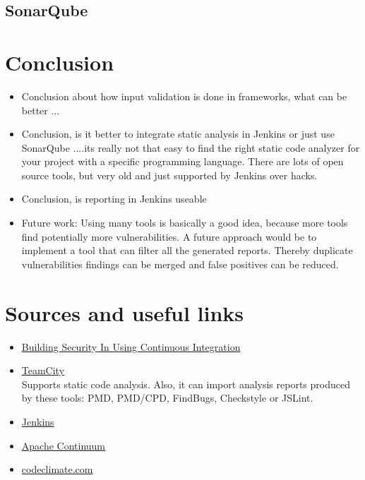 \documentclass[conference]{IEEEtran}
\begin{document}
\subsection{SonarQube}
\label{sec:evaluation_sonarqube}




\section{Conclusion}
\label{sec:conclusion}
\begin{itemize}
	\item Conclusion about how input validation is done in frameworks, what can be better ...
	\item Conclusion, is it better to integrate static analysis in Jenkins or just use SonarQube
	....its really not that easy to find the right static code analyzer for your project with a specific programming language. There are lots of open source tools, but very old and just supported by Jenkins over hacks.
	\item Conclusion, is reporting in Jenkins useable
	\item Future work: Using many tools is basically a good idea, because more tools find potentially more vulnerabilities. A future approach would be to implement a tool that can filter all the generated reports. Thereby duplicate vulnerabilities findings can be merged and false positives can be reduced.
\end{itemize}






\section{Sources and useful links}
\begin{itemize}
	\item \href{http://www.crosstalkonline.org/storage/issue-archives/2010/201003/201003-Stiehm.pdf}{Building Security In Using Continuous Integration}
	\item \href{http://www.jetbrains.com/teamcity}{TeamCity}\\
	Supports static code analysis. Also, it can import analysis reports produced by these tools: PMD, PMD/CPD, FindBugs, Checkstyle or JSLint.
	\item \href{http://jenkins-ci.org}{Jenkins}
	\item \href{http://continuum.apache.org}{Apache Continuum}	
	\item \href{http://codeclimate.com}{codeclimate.com}
\end{itemize}






\end{document}
